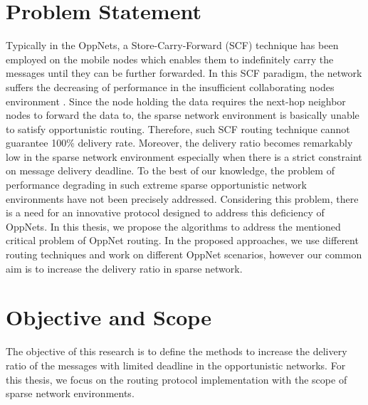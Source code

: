 \section{Problem Statement}
\label{intro:Problem Statement}


Typically in the OppNets, a Store-Carry-Forward (SCF) technique has been employed on the mobile nodes which enables them to indefinitely carry the messages until they can be further forwarded.
%
In this SCF paradigm, the network suffers the decreasing of performance in the insufficient collaborating nodes environment \cite{Nousiainen2013,Spyropoulos2010}.
%
Since the node holding the data requires the next-hop neighbor nodes to forward the data to, the sparse network environment is basically unable to satisfy opportunistic routing.
%
Therefore, such SCF routing technique cannot guarantee 100\% delivery rate. 
%
Moreover, the delivery ratio becomes remarkably low in the sparse network environment especially when there is a strict constraint on message delivery deadline.
%
To the best of our knowledge, the problem of performance degrading in such extreme sparse opportunistic network environments have not been precisely addressed.
%
Considering this problem, there is a need for an innovative protocol designed  to address this deficiency of OppNets.
%
In this thesis, we propose the algorithms to address the mentioned critical problem of OppNet routing.
%
In the proposed approaches, we use different routing techniques and work on different OppNet scenarios, however our common aim is to increase the delivery ratio in sparse network.



\section{Objective and Scope}
\label{intro:Objective and Scope}
The objective of this research is to define the methods to increase the delivery ratio of the messages with limited deadline in the opportunistic networks.
%
For this thesis, we focus on the routing protocol implementation with the scope of sparse network environments.

